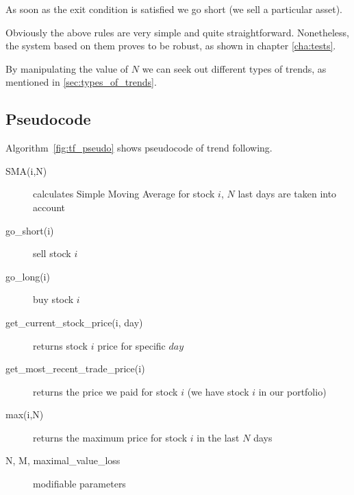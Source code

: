 As soon as the exit condition is satisfied we go short (we sell a particular asset).
 
Obviously the above rules are very simple and quite straightforward.
Nonetheless, the system based on them proves to be robust, as shown in chapter \ref{cha:tests}.
   
By manipulating the value of $N$ we can seek out different types of trends, as mentioned in \ref{sec:types_of_trends}. 

\subsection{Pseudocode}

Algorithm~\ref{fig:tf_pseudo} shows pseudocode of trend following.


\begin{description}


\item[SMA(i,N)]
  calculates Simple Moving Average for stock $i$, $N$ last days are taken into account  
\item[go\_short(i)]
  sell stock $i$
\item[go\_long(i)]
  buy stock $i$
\item[get\_current\_stock\_price(i, day)]
  returns stock $i$ price for specific $day$ 
\item[get\_most\_recent\_trade\_price(i)]
  returns the price we paid for stock $i$ (we have stock $i$ in our portfolio)
\item[max(i,N)]
  returns the maximum price for stock $i$ in the last $N$ days
\item[N, M, maximal\_value\_loss]
  modifiable parameters
\end{description}
% 


% 
% 
% 
% 
% 
% 
% 
% 

